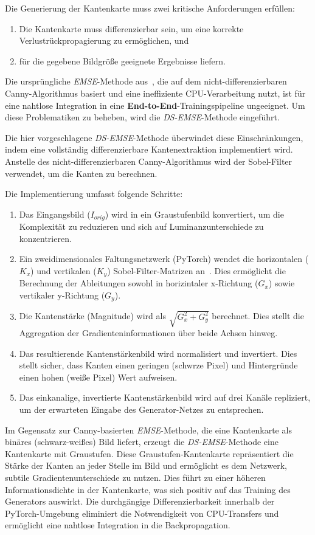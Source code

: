 Die Generierung der Kantenkarte muss zwei kritische Anforderungen erfüllen:
\begin{enumerate}
    \item Die Kantenkarte muss differenzierbar sein, um eine korrekte Verlustrückpropagierung zu ermöglichen, und 
    \item für die gegebene Bildgröße geeignete Ergebnisse liefern.
\end{enumerate}
Die ursprüngliche \textit{\ac{EMSE}}-Methode aus~\cite{He_2023_ICCV}, die auf dem nicht-differenzierbaren Canny-Algorithmus basiert und eine ineffiziente CPU-Verarbeitung nutzt, ist für eine nahtlose Integration in eine \textbf{End-to-End}-Trainingspipeline ungeeignet. Um diese Problematiken zu beheben, wird die \textit{\ac{DS-EMSE}}-Methode eingeführt.

Die hier vorgeschlagene \textit{\ac{DS-EMSE}}-Methode überwindet diese Einschränkungen, indem eine vollständig differenzierbare Kantenextraktion implementiert wird. Anstelle des nicht-differenzierbaren Canny-Algorithmus wird der Sobel-Filter verwendet, um die Kanten zu berechnen.

Die Implementierung umfasst folgende Schritte:
\begin{enumerate}
\item Das Eingangsbild ($I_{orig}$) wird in ein Graustufenbild konvertiert, um die Komplexität zu reduzieren und sich auf Luminanzunterschiede zu konzentrieren.
\item Ein zweidimensionales Faltungsnetzwerk (PyTorch) wendet die horizontalen ($K_x$) und vertikalen ($K_y$) Sobel-Filter-Matrizen an~\cite{Sobel2014operator}. Dies ermöglicht die Berechnung der Ableitungen sowohl in horizintaler x-Richtung ($G_x$) sowie vertikaler y-Richtung ($G_y$).
\item Die Kantenstärke (Magnitude) wird als $\sqrt{G_x^2 + G_y^2}$ berechnet. Dies stellt die Aggregation der Gradienteninformationen über beide Achsen hinweg.
\item Das resultierende Kantenstärkenbild wird normalisiert und invertiert. Dies stellt sicher, dass Kanten einen geringen (schwrze Pixel) und Hintergründe einen hohen (weiße Pixel) Wert aufweisen.
\item Das einkanalige, invertierte Kantenstärkenbild wird auf drei Kanäle repliziert, um der erwarteten Eingabe des Generator-Netzes zu entsprechen.
\end{enumerate}
Im Gegensatz zur Canny-basierten \textit{\ac{EMSE}}-Methode, die eine Kantenkarte als binäres (schwarz-weißes) Bild liefert, erzeugt die \textit{\ac{DS-EMSE}}-Methode eine Kantenkarte mit Graustufen. Diese Graustufen-Kantenkarte repräsentiert die Stärke der Kanten an jeder Stelle im Bild und ermöglicht es dem Netzwerk, subtile Gradientenunterschiede zu nutzen. Dies führt zu einer höheren Informationsdichte in der Kantenkarte, was sich positiv auf das Training des Generators auswirkt. Die durchgängige Differenzierbarkeit innerhalb der PyTorch-Umgebung eliminiert die Notwendigkeit von \ac{CPU}-Transfers und ermöglicht eine nahtlose Integration in die Backpropagation.

